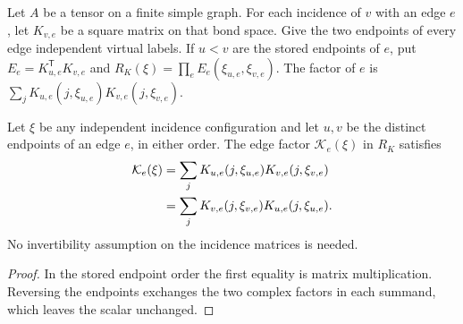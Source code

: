 \begin{definition}%
    \label{def:peps_independent_leg_coefficient}
    \leanok
    Let $A$ be a tensor on a finite simple graph. For each incidence of
    $v$ with an edge $e$, let $K_{v,e}$ be a square matrix on that bond
    space. Give the two endpoints of every edge independent virtual labels.
    If $u<v$ are the stored endpoints of $e$, put
    $E_e=K_{u,e}^{\mathsf T}K_{v,e}$ and
    $R_K(\xi)=\prod_e E_e(\xi_{u,e},\xi_{v,e})$.
    The factor of $e$ is
    $\sum_jK_{u,e}(j,\xi_{u,e})K_{v,e}(j,\xi_{v,e})$.
\end{definition}

\begin{lemma}%
    \label{thm:peps_independent_leg_endpoint_order}
    \leanok
    Let $\xi$ be any independent incidence configuration and let $u,v$ be
    the distinct endpoints of an edge $e$, in either order. The edge factor
    $\mathcal K_e(\xi)$ in $R_K$ satisfies
    \begin{align}
        \mathcal K_e(\xi)
         & =\sum_jK_{u,e}(j,\xi_{u,e})K_{v,e}(j,\xi_{v,e})\notag  \\
         & =\sum_jK_{v,e}(j,\xi_{v,e})K_{u,e}(j,\xi_{u,e}).\notag
    \end{align}
    No invertibility assumption on the incidence matrices is needed.
\end{lemma}
\begin{proof}\leanok
    In the stored endpoint order the first equality is matrix multiplication.
    Reversing the endpoints exchanges the two complex factors in each
    summand, which leaves the scalar unchanged.
\end{proof}

